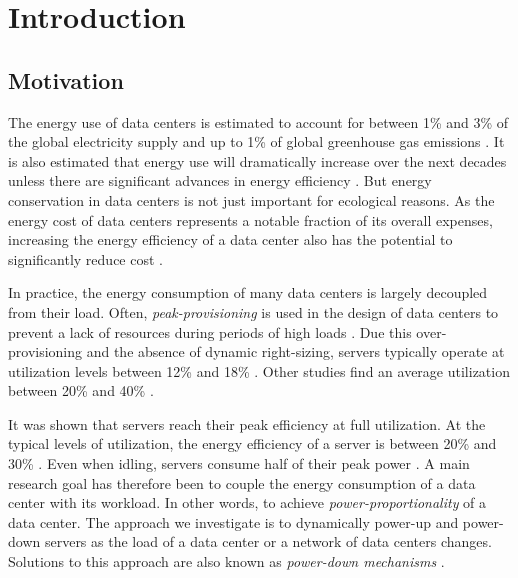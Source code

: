 
\chapter{Introduction}\label{chapter:introduction}

\section{Motivation}

The energy use of data centers is estimated to account for between 1\% and 3\% of the global electricity supply and up to 1\% of global greenhouse gas emissions \cite{Shehabi2016, Jones2018, Bashroush2020, Masanet2020}. It is also estimated that energy use will dramatically increase over the next decades unless there are significant advances in energy efficiency \cite{Jones2018}. But energy conservation in data centers is not just important for ecological reasons. As the energy cost of data centers represents a notable fraction of its overall expenses, increasing the energy efficiency of a data center also has the potential to significantly reduce cost \cite{Barroso2007, Brill2007, Hamilton2008}.

In practice, the energy consumption of many data centers is largely decoupled from their load. Often, \emph{peak-provisioning} is used in the design of data centers to prevent a lack of resources during periods of high loads \cite{Whitney2014}. Due this over-provisioning and the absence of dynamic right-sizing, servers typically operate at utilization levels between 12\% and 18\% \cite{Whitney2014}. Other studies find an average utilization between 20\% and 40\% \cite{Barroso2007, Armbrust2010}.

It was shown that servers reach their peak efficiency at full utilization. At the typical levels of utilization, the energy efficiency of a server is between 20\% and 30\% \cite{Barroso2007}. Even when idling, servers consume half of their peak power \cite{Barroso2007}. A main research goal has therefore been to couple the energy consumption of a data center with its workload. In other words, to achieve \emph{power-proportionality} of a data center. The approach we investigate is to dynamically power-up and power-down servers as the load of a data center or a network of data centers changes. Solutions to this approach are also known as \emph{power-down mechanisms} \cite{Jin2016}.

